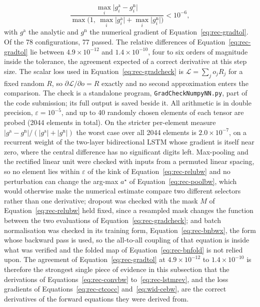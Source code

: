 \begin{equation}
\frac{\max_i\lvert g_i^{\mathrm{a}}-g_i^{\mathrm{n}}\rvert}{\max\bigl(1,\ \max_i\lvert g_i^{\mathrm{a}}\rvert+\max_i\lvert g_i^{\mathrm{n}}\rvert\bigr)}<10^{-6},
\label{eq:rec-gradtol}
\end{equation}
with $g^{\mathrm{a}}$ the analytic and $g^{\mathrm{n}}$ the numerical gradient of Equation~\ref{eq:rec-gradtol}.
Of the 78 configurations, 77 passed. The relative differences of Equation~\ref{eq:rec-gradtol} lie between $4.9\times10^{-12}$ and $1.4\times10^{-10}$, four to six orders of magnitude inside the tolerance, the agreement expected of a correct derivative at this step size.
The scalar loss used in Equation~\ref{eq:rec-gradcheck} is $\mathcal L=\sum_j o_jR_j$ for a fixed random $R$, so $\partial\mathcal L/\partial o=R$ exactly and no second approximation enters the comparison.
The check is a standalone program, \texttt{GradCheckNumpyNN.py}, part of the code submission; its full output is saved beside it.
All arithmetic is in double precision, $\varepsilon=10^{-5}$, and up to 40 randomly chosen elements of each tensor are probed (2044 elements in total).
On the stricter per-element measure $\lvert g^{\mathrm a}-g^{\mathrm n}\rvert/(\lvert g^{\mathrm a}\rvert+\lvert g^{\mathrm n}\rvert)$ the worst case over all 2044 elements is $2.0\times10^{-7}$, on a recurrent weight of the two-layer bidirectional LSTM whose gradient is itself near zero, where the central difference has no significant digits left.
Max-pooling and the rectified linear unit were checked with inputs from a permuted linear spacing, so no element lies within $\varepsilon$ of the kink of Equation~\ref{eq:rec-relubw} and no perturbation can change the arg-max $a^{\star}$ of Equation~\ref{eq:rec-poolbw}, which would otherwise make the numerical estimate compare two different selectors rather than one derivative; dropout was checked with the mask $M$ of Equation~\ref{eq:rec-relubw} held fixed, since a resampled mask changes the function between the two evaluations of Equation~\ref{eq:rec-gradcheck}; and batch normalisation was checked in its training form, Equation~\ref{eq:rec-bnbwx}, the form whose backward pass is used, so the all-to-all coupling of that equation is inside what was verified and the folded map of Equation~\ref{eq:rec-bnfold} is not relied upon.
The agreement of Equation~\ref{eq:rec-gradtol} at $4.9\times10^{-12}$ to $1.4\times10^{-10}$ is therefore the strongest single piece of evidence in this subsection that the derivations of Equations~\ref{eq:rec-convbw} to~\ref{eq:rec-lstmrev}, and the loss gradients of Equations~\ref{eq:rec-ctcocc} and~\ref{eq:wid-cebw}, are the correct derivatives of the forward equations they were derived from.


